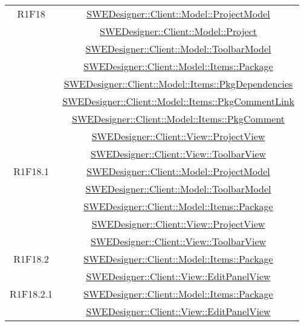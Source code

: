 \documentclass[../DefinizioneDiProdotto.tex]{subfiles}
\begin{document}
\begin{longtable}{|c|c|}
				R1F18
				& \hyperlink{SWEDesigner::Client::Model::ProjectModel}{SWEDesigner::Client::Model::ProjectModel}\\
				& \hyperlink{SWEDesigner::Client::Model::Project}{SWEDesigner::Client::Model::Project}\\
				& \hyperlink{SWEDesigner::Client::Model::ToolbarModel}{SWEDesigner::Client::Model::ToolbarModel}\\
				& \hyperlink{SWEDesigner::Client::Model::Items::Package}{SWEDesigner::Client::Model::Items::Package}\\
				& \hyperlink{SWEDesigner::Client::Model::Items::PkgDependencies}{SWEDesigner::Client::Model::Items::PkgDependencies}\\
				& \hyperlink{SWEDesigner::Client::Model::Items::PkgCommentLink}{SWEDesigner::Client::Model::Items::PkgCommentLink}\\
				& \hyperlink{SWEDesigner::Client::Model::Items::PkgComment}{SWEDesigner::Client::Model::Items::PkgComment}\\
				& \hyperlink{SWEDesigner::Client::View::ProjectView}{SWEDesigner::Client::View::ProjectView}\\
				& \hyperlink{SWEDesigner::Client::View::ToolbarView}{SWEDesigner::Client::View::ToolbarView}\\
				\hline

				R1F18.1
				& \hyperlink{SWEDesigner::Client::Model::ProjectModel}{SWEDesigner::Client::Model::ProjectModel}\\
				& \hyperlink{SWEDesigner::Client::Model::ToolbarModel}{SWEDesigner::Client::Model::ToolbarModel}\\
				& \hyperlink{SWEDesigner::Client::Model::Items::Package}{SWEDesigner::Client::Model::Items::Package}\\
				& \hyperlink{SWEDesigner::Client::View::ProjectView}{SWEDesigner::Client::View::ProjectView}\\
				& \hyperlink{SWEDesigner::Client::View::ToolbarView}{SWEDesigner::Client::View::ToolbarView}\\
				\hline

				R1F18.2
				& \hyperlink{SWEDesigner::Client::Model::Items::Package}{SWEDesigner::Client::Model::Items::Package}\\
				& \hyperlink{SWEDesigner::Client::View::EditPanelView}{SWEDesigner::Client::View::EditPanelView}\\
				\hline

				R1F18.2.1
				& \hyperlink{SWEDesigner::Client::Model::Items::Package}{SWEDesigner::Client::Model::Items::Package}\\
				& \hyperlink{SWEDesigner::Client::View::EditPanelView}{SWEDesigner::Client::View::EditPanelView}\\
				\hline


\end{longtable}
\end{document}
